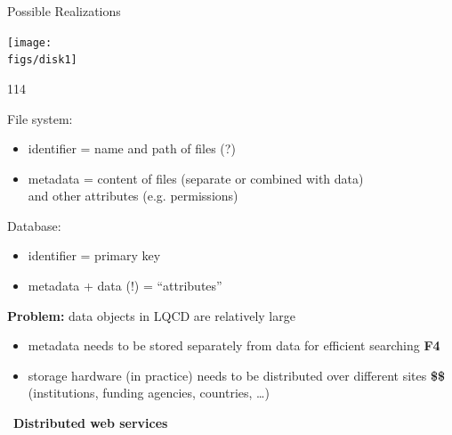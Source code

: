 \documentclass[aspectratio=169,xcolor=dvipsnames]{beamer}
\newcommand{\cyan}{\color{cy}} %
\def\Darrow{\ding{220}}
\newcommand{\bi}{\begin{itemize}}
\newcommand{\ei}{\end{itemize}}
\def\figs{figs3}
\begin{document}
\begin{frame}{Possible Realizations}

  \vspace*{5mm}
  \hfill \texttt{[image: \\figs/disk1]} \hspace*{10mm}

  \vspace*{-15mm}
  \begin{dinglist}{114}
  \item File system:
    \bi
    \item identifier = name and path of files (?)
    \item metadata = content of files (separate or combined with data) \\
      \hspace*{20mm} and other attributes (e.g. permissions)
    \ei
  \item Database:
    \bi
    \item identifier = primary key
    \item metadata + data (!) = ``attributes''
    \ei
  \end{dinglist}
  \vspace*{-14mm}\hfill
          {\footnotesize
          }

  \vspace*{3mm}
  {\bf Problem:} data objects in LQCD are relatively large
  \bi
  \item {\cyan metadata} needs to be stored \alert{separately} from data for efficient searching \hfill {\bf F4}
  \item storage hardware (in practice) needs to be \alert{distributed} over different sites \hfill {\bf \$\$} \\
    (institutions, funding agencies, countries, \ldots)
  \ei

  \vspace*{3mm}
  \Darrow\ {\bf Distributed web services}
    
\end{frame}
\end{document}
